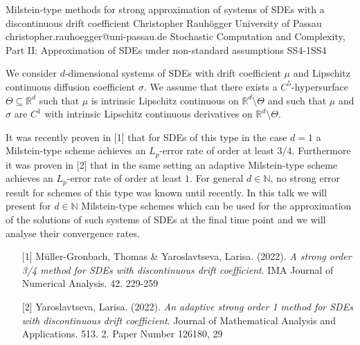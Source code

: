 \begin{talk}
  {Milstein-type methods for strong approximation of systems of SDEs with a discontinuous drift coefficient}%
  {Christopher Rauhögger}%
  {University of Passau}%
  {christopher.rauhoegger@uni-passau.de}%
  {}%
{Stochastic Computation and Complexity, Part II: Approximation of SDEs under non-standard assumptions}
{}{SS4-1}{SS4}

			
We consider $d$-dimensional systems of SDEs with drift coefficient $\mu$ and Lipschitz continuous diffusion coefficient $\sigma$. We assume that there exists a $C^{5}$-hypersurface
$\Theta\subseteq \mathbb{R}^{d}$ such that $\mu$ is intrinsic Lipschitz continuous on $\mathbb{R}^{d}\setminus \Theta$ and such that $\mu$ and $\sigma$ are $C^{1}$ with intrinsic Lipschitz continuous derivatives on $\mathbb{R}^{d}\setminus \Theta$. 

It was recently proven in [1] that for SDEs of this type in the case $d = 1$ a Milstein-type scheme achieves an $L_{p}$-error rate of order at least $3/4$. Furthermore it was proven in [2] that in the same setting an adaptive
Milstein-type scheme achieves an $L_{p}$-error rate of order at least $1$. 
For general $d \in \mathbb{N}$, no strong error result for schemes of this type was known until recently.
In this talk we will present for $d \in \mathbb{N}$ Milstein-type schemes which can be used for the approximation 
of the solutions of such systems of SDEs at the final time point and we will analyse their convergence rates. 

\medskip

\begin{enumerate}
	\item[{[1]}] M\"{u}ller-Gronbach, Thomas \& Yaroslavtseva, Larisa. (2022). {\it A strong order 3/4 method for {SDE}s with discontinuous drift
		coefficient}. IMA Journal of Numerical Analysis. 42. 229-259
	\item[{[2]}] Yaroslavtseva, Larisa. (2022). {\it An adaptive strong order 1 method for {SDE}s with
		discontinuous drift coefficient}. Journal of Mathematical Analysis and Applications. 513. 2. Paper Number 126180, 29
\end{enumerate}

\end{talk}

